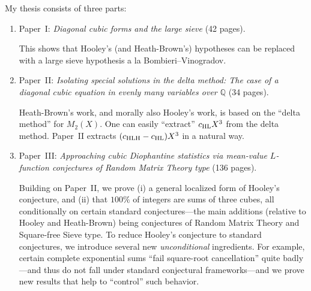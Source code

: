 \documentclass[12pt]{article}
\begin{document}
My thesis consists of three parts:
\begin{enumerate}
    \item Paper~I:
    \emph{Diagonal cubic forms and the large sieve}
    (42 pages).
    
    This shows that Hooley's (and Heath-Brown's) hypotheses can be replaced with
    a large sieve hypothesis a la Bombieri--Vinogradov.
    
    \item Paper~II:
    \emph{Isolating special solutions in the delta method:
    The case of a diagonal cubic equation in evenly many variables over $\mathbb{Q}$}
    (34 pages).
    
    Heath-Brown's work, and morally also Hooley's work, is based on the ``delta method'' for $M_2(X)$.
    One can easily ``extract'' $c_{\textnormal{HL}}X^3$ from the delta method.
    Paper~II extracts $(c_{\textnormal{HLH}}-c_{\textnormal{HL}})X^3$ in a natural way.
    
    \item Paper~III:
    \emph{Approaching cubic Diophantine statistics via mean-value $L$-function conjectures of Random Matrix Theory type}
    (136 pages).
    
    Building on Paper~II,
    we prove (i) a general localized form of Hooley's conjecture,
    and (ii) that $100\%$ of integers are sums of three cubes,
    all conditionally on certain standard conjectures---the main additions (relative to Hooley and Heath-Brown) being conjectures of Random Matrix Theory and Square-free Sieve type.
    To reduce Hooley's conjecture to standard conjectures,
    we introduce several new \emph{unconditional} ingredients.
    For example, certain complete exponential sums ``fail square-root cancellation'' quite badly---and thus do not fall under standard conjectural frameworks---and we prove new results that help to ``control'' such behavior.
\end{enumerate}


\end{document}
